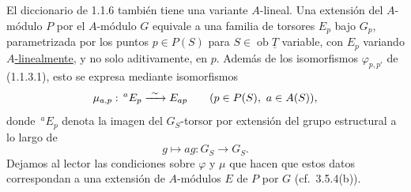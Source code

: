 El diccionario de 1.1.6 también tiene una variante $A$-lineal. Una
extensión del $A$-módulo $P$ por el $A$-módulo $G$ equivale a una
familia de torsores $E_p$ bajo $G_p$, parametrizada por los puntos
$p\in P(S)$ para $S\in\operatorname{ob}\underline T$ variable, con
$E_p$ variando \underline{$A$-linealmente}, y no solo aditivamente, en
$p$. Además de los isomorfismos $\varphi_{p,p'}$ de (1.1.3.1), esto se
expresa mediante isomorfismos
\[
 \mu_{a,p}:\,{}^{a}\sisi{P_p}{E_p}\xrightarrow{\ \sim\ }
 \sisi{P_{ap}}{E_{ap}}
 \qquad(p\in P(S),\ a\in A(S)),
\]
donde $\,{}^{a}E_p$ denota la imagen del $G_S$-torsor
 por extensión del grupo estructural a lo largo de
\[
 g\longmapsto ag:G_S\longrightarrow G_S.
\]
Dejamos al lector las condiciones sobre $\varphi$ y $\mu$ que hacen
que estos datos correspondan a una extensión de $A$-módulos $E$ de
$P$ por $G$ (cf.\ 3.5.4(b)).
